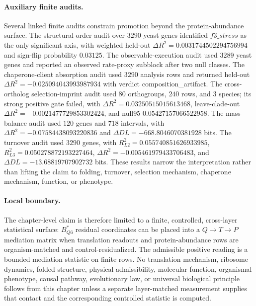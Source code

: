 \paragraph{Auxiliary finite audits.}
Several linked finite audits constrain promotion beyond the protein-abundance surface. The structural-order audit over $3290$ yeast genes identified $f3\_stress$ as the only significant axis, with weighted held-out $\Delta R^2=0.0031744502294756994$ and sign-flip probability $0.03125$. The observable-execution audit used $3289$ yeast genes and reported an observed rate-proxy subblock after two null classes. The chaperone-client absorption audit used $3290$ analysis rows and returned held-out $\Delta R^2=-0.025094043993987934$ with verdict composition\_artifact. The cross-ortholog selection-imprint audit used $80$ orthogroups, $240$ rows, and $3$ species; its strong positive gate failed, with $\Delta R^2=0.03250515015613468$, leave-clade-out $\Delta R^2=-0.0021477729853302424$, and null95 $0.05427157066522958$. The mass-balance audit used $120$ genes and $718$ intervals, with $\Delta R^2=-0.07584438093220836$ and $\Delta DL=-668.8046070381928$ bits. The turnover audit used $3290$ genes, with $R^2_{L2}=0.055740851626933985$, $R^2_{L3}=0.050278872193227464$, $\Delta R^2=-0.005461979433706483$, and $\Delta DL=-13.68819707902732$ bits. These results narrow the interpretation rather than lifting the claim to folding, turnover, selection mechanism, chaperone mechanism, function, or phenotype.

\paragraph{Local boundary.}
The chapter-level claim is therefore limited to a finite, controlled, cross-layer statistical surface: $B^*_{Q6}$ residual coordinates can be placed into a $Q\to T\to P$ mediation matrix when translation readouts and protein-abundance rows are organism-matched and control-residualized. The admissible positive reading is a bounded mediation statistic on finite rows. No translation mechanism, ribosome dynamics, folded structure, physical admissibility, molecular function, organismal phenotype, causal pathway, evolutionary law, or universal biological principle follows from this chapter unless a separate layer-matched measurement supplies that contact and the corresponding controlled statistic is computed.